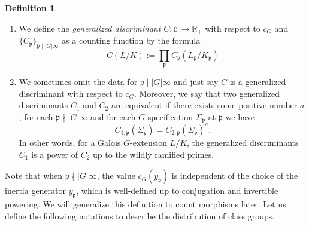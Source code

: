\documentclass[12pt,a4paper]{amsart}
\numberwithin{equation}{section}%
\theoremstyle{plain}%
\theoremstyle{definition}%
\newtheorem{definition}[theorem]{Definition}%
\theoremstyle{remark}%
\begin{document}
\begin{definition}
\begin{enumerate}
			For each $\mathfrak{p}\mid\lvert G\rvert\infty$ of $K$, a local generalized discriminant $C_{\mathfrak{p}}$ is any map $C_{\mathfrak{p}}:\{G-$specifications at $\mathfrak{p}\}\to\mathbb{R}_{+}$.
			\item We define the \emph{generalized discriminant} $C:\mathcal{C}\to\mathbb{R}_+$ with respect to $c_G$ and $\{C_{\mathfrak{p}}\}_{\mathfrak{p}\mid\lvert G\rvert\infty}$ as a counting function by the formula
			\begin{equation*}
				C(L/K):=\prod_{\mathfrak{p}}C_{\mathfrak{p}}(L_{\mathfrak{p}}/K_{\mathfrak{p}})
			\end{equation*}			 
			\item We sometimes omit the data for $\mathfrak{p}\mid\lvert G\rvert\infty$ and just say $C$ is a generalized discriminant with respect to $c_G$.
			Moreover, we say that two generalized discriminants $C_1$ and $C_2$ are equivalent if there exists some positive number $a$, for each $\mathfrak{p}\nmid\lvert G\rvert\infty$ and for each $G$-specification $\Sigma_{\mathfrak{p}}$ at $\mathfrak{p}$ we have
			\begin{equation*}
				C_{1,\mathfrak{p}}(\Sigma_{\mathfrak{p}})=C_{2,\mathfrak{p}}(\Sigma_{\mathfrak{p}})^{a}.
			\end{equation*}
			In other words, for a Galois $G$-extension $L/K$, the generalized discriminants $C_1$ is a power of $C_2$ up to the wildly ramified primes.
		\end{enumerate}		
	\end{definition}
	Note that when $\mathfrak{p}\nmid\lvert G\rvert\infty$, the value $c_G(y_{\mathfrak{p}})$ is independent of the choice of the inertia generator $y_{\mathfrak{p}}$, which is well-defined up to conjugation and invertible powering.
	We will generalize this definition to count morphisms later.
	Let us define the following notations to describe the distribution of class groups.
\end{document}
